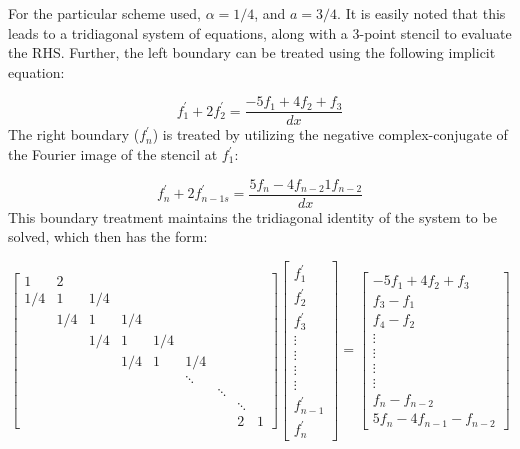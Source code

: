 \documentclass{elsarticle}
\begin{document}
For the particular scheme used, $\alpha = 1/4$,
and $ a = 3/4 $.
It is easily noted that this leads to a tridiagonal system of equations,
along with a 3-point stencil to evaluate the RHS.
Further, the left boundary can be treated using the following implicit equation:

\begin{equation}
    f^{\prime}_1 + 2f^{\prime}_2 = \frac{-5f_1 + 4f_2 + f_3}{dx}
\end{equation}
%
The right boundary ($f^{\prime}_{n}$) is treated by utilizing
the negative complex-conjugate of the Fourier image of the stencil
at $f^{\prime}_1$:

\begin{equation}
    f^{\prime}_{n} + 2f^{\prime}_{n-1s}
    =
    \frac{5f_{n} - 4f_{n-2} 1 f_{n-2}}{dx}
\end{equation}
%
This boundary treatment maintains the tridiagonal identity
of the system to be solved, which then has the form:

\begin{equation} \label{eqn:compact-tridiagonal-system}
 \begin{bmatrix}
     1&2\\
     1/4&1&1/4\\
     &1/4&1&1/4\\
     &&1/4&1&1/4\\
     &&&1/4&1&1/4\\
     &&&&&\ddots\\
     &&&&&&\ddots\\
     &&&&&&&\ddots\\
     &&&&&&&2&1
  \end{bmatrix}
  \begin{bmatrix}
      f^{\prime}_1 \\
      f^{\prime}_2 \\
      f^{\prime}_3 \\
      \vdots \\
      \vdots \\
      \vdots \\
      \vdots \\
      f^{\prime}_{n-1} \\
      f^{\prime}_n
   \end{bmatrix}
 =
 \begin{bmatrix}
     -5f_1 + 4f_2 + f_3\\
     f_{3} - f_{1}\\
     f_{4} - f_{2}\\
     \vdots\\
     \vdots\\
     \vdots\\
     \vdots\\
     f_{n} - f_{n-2}\\
     5f_{n} - 4f_{n-1} - f_{n-2}
  \end{bmatrix}
\end{equation}
\end{document}
